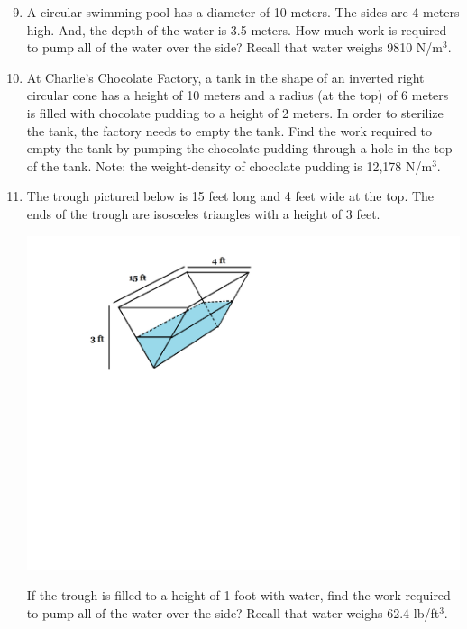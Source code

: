 \documentclass[12pt]{article}
\newif\ifans
\begin{document}
\begin{enumerate}
\setcounter{enumi}{8}

\item A circular swimming pool has a diameter of 10 meters.  The sides are 4 meters high.  And, the depth of the water is 3.5 meters.  How much work is required to pump all of the water over the side?  Recall that water weighs 9810 N/m$^3$.

\ifans{\fbox{$6.067 \times 10^6$ J}} \fi

\item At Charlie's Chocolate Factory, a tank in the shape of an inverted right circular cone has a height of 10 meters and a radius (at the top) of 6 meters is filled with chocolate pudding to a height of 2 meters.  In order to sterilize the tank, the factory needs to empty the tank.  Find the work required to empty the tank by pumping the chocolate pudding through a hole in the top of the tank. Note: the weight-density of chocolate pudding is 12,178 N/m$^3$.

\ifans{\fbox{$\frac{2,484,312}{25}\pi$ J}} \fi

\item The trough pictured below is 15 feet long and 4 feet wide at the top.  The ends of the trough are isosceles triangles with a height of 3 feet.  
\begin{center}
\includegraphics[scale=0.6]{trough.pdf}
\end{center}
If the trough is filled to a height of 1 foot with water, find the work required to pump all of the water over the side?  Recall that water weighs 62.4 lb/ft$^3$.


\end{enumerate}
\end{document}
